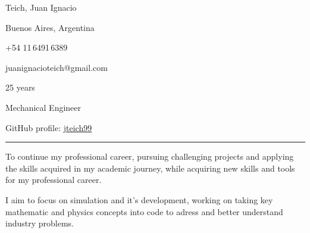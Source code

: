 \documentclass[a4paper,10pt]{article}
\newlength{\cvcolumngapwidth}
\newlength{\cvleftcolumnwidth}
\newlength{\cvrightcolumnwidth}
\newcommand{\cvnamestyle}[1]{{\Large\cvnamefont\textcolor{cvnamecolor}{#1}}}
\newcommand{\cvsectionstyle}[1]{{\normalsize\cvsectionfont\textcolor{cvsectioncolor}{#1}}}
\newcommand{\cvheadingstyle}[1]{{\normalsize\cvheadingfont\textcolor{cvheadingcolor}{#1}}}
\newlength{\cvafteritemskipamount}
\newlength{\cvaftersectionskipamount}
\newlength{\cvbetweensectionandheadingextraskipamount}
\newlength{\cvafternameskipamount}
\newlength{\cvafterpersonalinfolineskipamount}
\newlength{\cvparskip}
\newcommand{\cvpersonalinfo}[2]{
    \begin{minipage}[t]{\cvleftcolumnwidth}
        \vspace{0mm} %
        \raggedleft #1
    \end{minipage}%
    \hspace{\cvcolumngapwidth}%
    \begin{minipage}[t]{\cvrightcolumnwidth}
        \vspace{0mm} %
        #2
    \end{minipage}

    \vspace{\cvafteritemskipamount}
}
\newcommand{\cvname}[1]{
    \cvnamestyle{#1}

    \vspace{\cvafternameskipamount}
}
\newcommand{\cvpersonalinfolinewithicon}[3]{
    \raisebox{.5\fontcharht\font`E-.5\height}{\texttt{[image: \#2]}}
    #3

    \vspace{\cvafterpersonalinfolineskipamount}
}
\newcommand{\cvpersonalinfolinewithiconsvg}[3]{
    \raisebox{.5\fontcharht\font`E-.5\height}{}
    #3

    \vspace{\cvafterpersonalinfolineskipamount}
}
\newcommand{\cvsection}[1]{
    \begin{minipage}[t]{\cvleftcolumnwidth}
        \raggedleft\cvsectionstyle{#1}
    \end{minipage}%
    \hspace{\cvcolumngapwidth}%
    \begin{minipage}[t]{\cvrightcolumnwidth}
        \textcolor{cvrulecolor}{\rule{\cvrightcolumnwidth}{0.3mm}}
    \end{minipage}

    \vspace{\cvaftersectionskipamount}
}
\newcommand{\cvitem}[2]{
    \begin{minipage}[t]{\cvleftcolumnwidth}
        \raggedleft #1
    \end{minipage}%
    \hspace{\cvcolumngapwidth}%
    \begin{minipage}[t]{\cvrightcolumnwidth}
        \setlength{\parskip}{\cvparskip} #2
    \end{minipage}

    \vspace{\cvafteritemskipamount}
}
\begin{document}

\cvpersonalinfo{
    \hspace{7cm}
}{
    \cvname{Teich, Juan Ignacio}

    \cvpersonalinfolinewithiconsvg{height=4mm}{../logos-photos/location-dot-solid.svg}{
       Buenos Aires, Argentina
    }

    \cvpersonalinfolinewithiconsvg{height=4mm}{../logos-photos/phone-solid.svg}{
        +54 11\,6491\,6389
    }

    \cvpersonalinfolinewithiconsvg{height=3mm}{../logos-photos/envelope-solid.svg}{
        juanignacioteich@gmail.com
    }


    \cvpersonalinfolinewithiconsvg{height=4mm}{../logos-photos/calendar-days-solid.svg}{
        25 years
    }

    \cvpersonalinfolinewithiconsvg{height=4mm}{../logos-photos/gear-solid.svg}{
        Mechanical Engineer 
    }

    \cvpersonalinfolinewithiconsvg{height=4mm}{../logos-photos/github-brands-solid.svg}{
        GitHub profile: \href{https://github.com/jteich99}{jteich99}   
    }

}


\cvsection{PROFESSIONAL OBJECTIVES}

\vspace{\cvbetweensectionandheadingextraskipamount}
\cvitem{\cvheadingstyle{}}{
    To continue my professional career, pursuing challenging projects and applying the skills acquired in my academic
    journey, while acquiring new skills and tools for my professional career.

    I aim to focus on simulation and it's development, working on taking key mathematic and physics concepts into code to adress and better understand industry problems.
}
\end{document}

